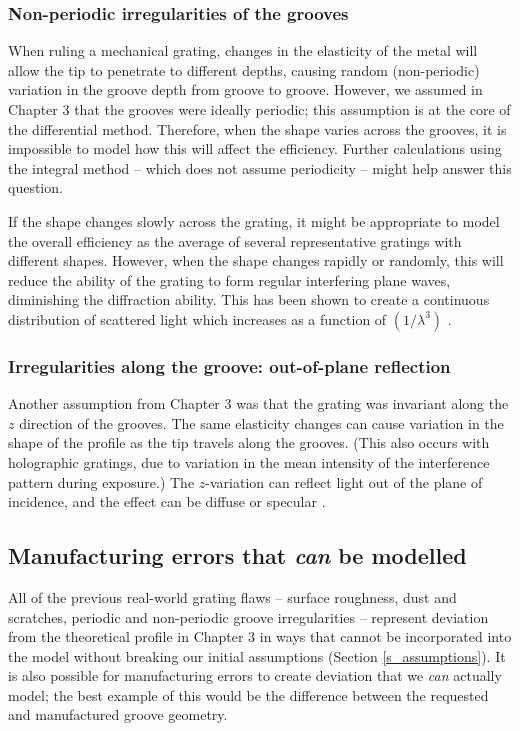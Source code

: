 \subsubsection{Non-periodic irregularities of the grooves}
When ruling a mechanical grating, changes in the elasticity of the metal will allow the tip to penetrate to different depths, causing random (non-periodic) variation in the groove depth from groove to groove.  However, we assumed in Chapter 3 that the grooves were ideally periodic; this assumption is at the core of the differential method.  Therefore, when the shape varies across the grooves, it is impossible to model how this will affect the efficiency.  Further calculations using the integral method -- which does not assume periodicity -- might help answer this question.

If the shape changes slowly across the grating, it might be appropriate to model the overall efficiency as the average of several representative gratings with different shapes.  However, when the shape changes rapidly or randomly, this will reduce the ability of the grating to form regular interfering plane waves, diminishing the diffraction ability.  This has been shown to create a continuous distribution of scattered light which increases as a function of $(1/\lambda^3)$ \cite{Sha78}.

\subsubsection{Irregularities along the groove: out-of-plane reflection}
Another assumption from Chapter 3 was that the grating was invariant along the $z$ direction of the grooves.  The same elasticity changes can cause variation in the shape of the profile as the tip travels along the grooves.  (This also occurs with holographic gratings, due to variation in the mean intensity of the interference pattern during exposure.)  The $z$-variation can reflect light out of the plane of incidence, and the effect can be diffuse or specular \cite{Pal05}.

\subsection{Manufacturing errors that \emph{can} be modelled}
All of the previous real-world grating flaws -- surface roughness, dust and scratches, periodic and non-periodic groove irregularities -- represent deviation from the theoretical profile in Chapter 3 in ways that cannot be incorporated into the model without breaking our initial assumptions (Section \ref{s_assumptions}).  It is also possible for manufacturing errors to create deviation that we \emph{can} actually model; the best example of this would be the difference between the requested and manufactured groove geometry.
